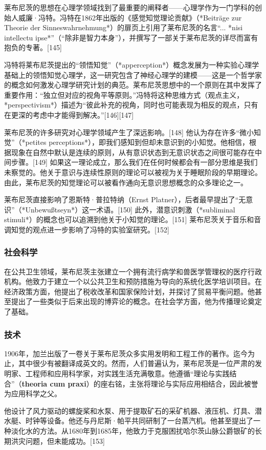 莱布尼茨的思想在心理学领域找到了最重要的阐释者——心理学作为一门学科的创始人威廉·冯特。冯特在1862年出版的《感觉知觉理论贡献》（*Beiträge zur Theorie der Sinneswahrnehmung*）的扉页上引用了莱布尼茨的名言“... *nisi intellectu ipse*”（“除非是智力本身”），并撰写了一部关于莱布尼茨的详尽而富有抱负的专著。[145]  

冯特将莱布尼茨提出的“领悟知觉”（*apperception*）概念发展为一种实验心理学基础上的领悟知觉心理学，这一研究包含了神经心理学的建模——这是一个哲学家的概念如何激发心理学研究计划的典范。莱布尼茨思想中的一个原则在其中发挥了重要作用：“独立但对应的视角平等原则。”冯特将这种思维方式（观点主义，*perspectivism*）描述为“彼此补充的视角，同时也可能表现为相反的观点，只有在更深的考虑中才能得到解决。”[146][147]  

莱布尼茨的许多研究对心理学领域产生了深远影响。[148] 他认为存在许多“微小知觉”（*petites perceptions*），即我们感知到但却未意识到的小知觉。他相信，根据现象在自然中默认是连续的原则，从有意识状态到无意识状态之间很可能存在中间步骤。[149] 如果这一理论成立，那么我们在任何时候都会有一部分思维是我们未察觉的。他关于意识与连续性原则的理论可以被视为关于睡眠阶段的早期理论。由此，莱布尼茨的知觉理论可以被看作通向无意识思想概念的众多理论之一。  

莱布尼茨直接影响了恩斯特·普拉特纳（Ernst Platner），后者最早提出了“无意识”（*Unbewußtseyn*）这一术语。[150] 此外，潜意识刺激（*subliminal stimuli*）的概念也可以追溯到他关于小知觉的理论。[151] 莱布尼茨关于音乐和音调知觉的观点进一步影响了冯特的实验室研究。[152]
\subsubsection{社会科学}
在公共卫生领域，莱布尼茨主张建立一个拥有流行病学和兽医学管理权的医疗行政机构。他致力于建立一个以公共卫生和预防措施为导向的系统化医学培训项目。在经济政策方面，他提出了税收改革和国家保险计划，并探讨了贸易平衡问题。他甚至提出了一些类似于后来出现的博弈论的概念。在社会学方面，他为传播理论奠定了基础。
\subsubsection{技术}
1906年，加兰出版了一卷关于莱布尼茨众多实用发明和工程工作的著作。迄今为止，其中很少有被翻译成英文的。然而，人们普遍认为，莱布尼茨是一位严肃的发明家、工程师和应用科学家，对实践生活充满敬意。他遵循“理论与实践结合”（\textbf{theoria cum praxi}）的座右铭，主张将理论与实际应用相结合，因此被誉为应用科学之父。

他设计了风力驱动的螺旋桨和水泵、用于提取矿石的采矿机器、液压机、灯具、潜水艇、时钟等设备。他还与丹尼斯·帕平共同研制了一台蒸汽机。他甚至提出了一种淡化水的方法。从1680年到1685年，他致力于克服困扰哈尔茨山脉公爵银矿的长期洪灾问题，但未能成功。[153]

